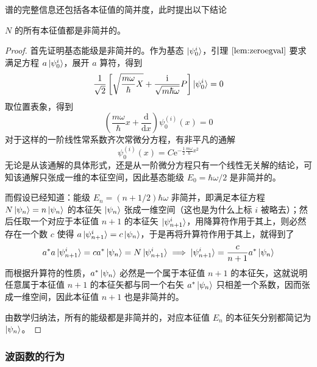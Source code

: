 \documentclass[cn,10pt,math=newtx,citestyle=gb7714-2015,bibstyle=gb7714-2015]{elegantbook}
\def\d{\mathrm d}
\def\e{\mathrm e}
\def\i{\mathrm i}
\begin{document}
谱的完整信息还包括各本征值的简并度，此时提出以下结论
\begin{theorem}[$N$ 的本征值的简并度]\label{thm:1d_hrmnc_osclt_nndgnrtn}
   $N$ 的所有本征值都是非简并的。
\end{theorem}
\begin{proof}
    首先证明基态能级是非简并的。作为基态 $\ket{\psi_0^i}$，引理 $\ref{lem:zeroegval}$ 要求满足方程 $a\ket{\psi_0^i}$，展开 $a$ 算符，得到
    \begin{equation}
        \frac 1 {\sqrt 2}\left[\sqrt{\frac{m\omega}{\hbar}X}+\frac{\i}{\sqrt{m\hbar\omega}}P\right]\ket{\psi_0^i}=0
    \end{equation}
    取位置表象，得到
    \begin{equation}
        \left(\frac{m\omega}{\hbar}x+\frac{\d}{\d x}\right)\psi_0^{(i)}(x)=0
    \end{equation}
    对于这样的一阶线性常系数齐次常微分方程，有非平凡的通解
    \begin{equation}\label{eq:1d_hrmnc_osclt_grnd_0}
        \psi_0^{(i)}(x)=C\e^{-\frac 1 2 \frac{m\omega}{\hbar}x^2}
    \end{equation}
    无论是从该通解的具体形式，还是从一阶微分方程只有一个线性无关解的结论，可知该通解只张成一维的本征空间，因此基态能级 $E_0=\hbar\omega/2$ 是非简并的。
    
    而假设已经知道：能级 $E_n=(n+1/2)\hbar\omega$ 非简并，即满足本征方程 $N\ket{\psi_n}=n\ket{\psi_n}$ 的本征矢 $\ket{\psi_n}$ 张成一维空间（这也是为什么上标 $i$ 被略去）；然后任取一个对应于本征值 $n+1$ 的本征矢 $\ket{\psi_{n+1}^i}$，用降算符作用于其上，则必然存在一个数 $c$ 使得
    $a\ket{\psi_{n+1}^i}=c\ket{\psi_n}$，于是再将升算符作用于其上，就得到了
    \begin{equation}
        a^*a\ket{\psi_{n+1}^i}=ca^*\ket{\psi_n}=N\ket{\psi_{n+1}^i}\implies\ket{\psi_{n+1}^i}=\frac{c}{n+1}a^*\ket{\psi_n}
    \end{equation}
    而根据升算符的性质，$a^*\ket{\psi_n}$ 必然是一个属于本征值 $n+1$ 的本征矢，这就说明任意属于本征值 $n+1$ 的本征矢都与同一个右矢 $a^*\ket{\psi_n}$ 只相差一个系数，因而张成一维空间，因此本征值 $n+1$ 也是非简并的。
    
    由数学归纳法，所有的能级都是非简并的，对应本征值 $E_n$ 的本征矢分别都简记为 $\ket{\psi_n}$。
\end{proof}

\subsubsection{波函数的行为}
\end{document}
